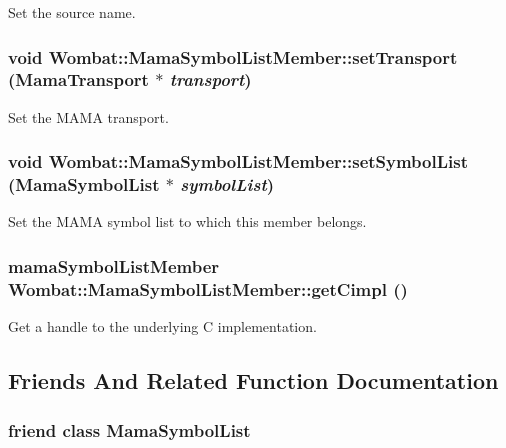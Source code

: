 Set the source name. \hypertarget{classWombat_1_1MamaSymbolListMember_ab335a8f3a660d206c40fb2b5d561faa9}{
\subsubsection[{setTransport}]{\setlength{\rightskip}{0pt plus 5cm}void Wombat::MamaSymbolListMember::setTransport ({\bf MamaTransport} $\ast$ {\em transport})}}
\label{classWombat_1_1MamaSymbolListMember_ab335a8f3a660d206c40fb2b5d561faa9}


Set the MAMA transport. \hypertarget{classWombat_1_1MamaSymbolListMember_a9e3da0f70fcd48cfd9d0e2adae152234}{
\subsubsection[{setSymbolList}]{\setlength{\rightskip}{0pt plus 5cm}void Wombat::MamaSymbolListMember::setSymbolList ({\bf MamaSymbolList} $\ast$ {\em symbolList})}}
\label{classWombat_1_1MamaSymbolListMember_a9e3da0f70fcd48cfd9d0e2adae152234}


Set the MAMA symbol list to which this member belongs. \hypertarget{classWombat_1_1MamaSymbolListMember_a4e125066d1f8b2d3f75a7928fa9966c5}{
\subsubsection[{getCimpl}]{\setlength{\rightskip}{0pt plus 5cm}mamaSymbolListMember Wombat::MamaSymbolListMember::getCimpl ()}}
\label{classWombat_1_1MamaSymbolListMember_a4e125066d1f8b2d3f75a7928fa9966c5}


Get a handle to the underlying C implementation. 

\subsection{Friends And Related Function Documentation}
\hypertarget{classWombat_1_1MamaSymbolListMember_a8688dc35341e649acdc8b141807a9538}{
\subsubsection[{MamaSymbolList}]{\setlength{\rightskip}{0pt plus 5cm}friend class {\bf MamaSymbolList}}}
\label{classWombat_1_1MamaSymbolListMember_a8688dc35341e649acdc8b141807a9538}
